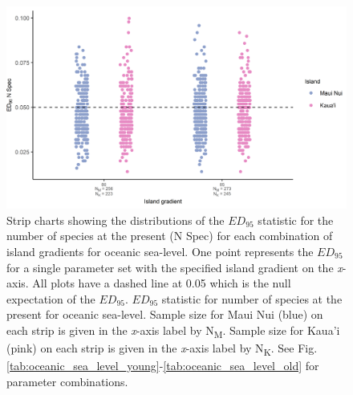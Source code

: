 \begin{figure}
    \centering
    \includegraphics{Island_gradient_sea_level_num_spec.png}
    \caption{Strip charts showing the distributions of the $ED_{95}$ statistic for the number of species at the present (N Spec) for each combination of island gradients for oceanic sea-level. One point represents the $ED_{95}$ for a single parameter set with the specified island gradient on the \textit{x}-axis. All plots have a dashed line at 0.05 which is the null expectation of the $ED_{95}$. $ED_{95}$ statistic for number of species at the present for oceanic sea-level. Sample size for Maui Nui (blue) on each strip is given in the \textit{x}-axis label by N\textsubscript{M}. Sample size for Kaua'i (pink) on each strip is given in the \textit{x}-axis label by N\textsubscript{K}. See Fig. \ref{tab:oceanic_sea_level_young}-\ref{tab:oceanic_sea_level_old} for parameter combinations.}
    \label{fig:Island_gradient_sea_level_num_spec}
\end{figure}

